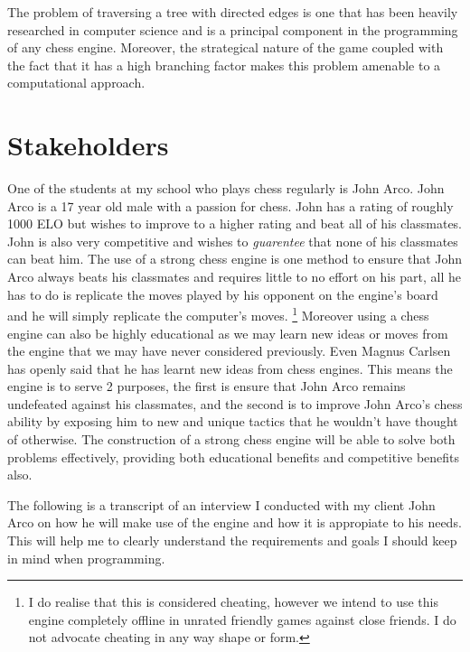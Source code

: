 The problem of traversing a tree with directed edges is one
that has been heavily researched in computer science and is 
a principal component in the programming of any chess engine.
Moreover, the strategical nature of the game coupled 
with the fact that it has a high branching factor makes this
problem amenable to a computational approach.


\section{Stakeholders}
One of the students at my school who plays chess regularly is 
John Arco. John Arco is a 17 year old male with a passion for chess.
John has a rating of roughly 1000 ELO but wishes 
to improve to a higher rating and beat all of his 
classmates. John is also very competitive and wishes to 
\textit{guarentee} that none of his classmates can beat him.
The use of a strong chess engine is one method to ensure
that John Arco always beats his classmates and requires little
to no effort on his part, all he has to do is replicate the 
moves played by his opponent on the engine's board and he 
will simply replicate the computer's moves. 
\footnote{I do realise that this is considered cheating,
however we intend to use this engine completely offline
in unrated friendly games against close friends. 
I do not advocate cheating in any way shape or form.}
Moreover using a chess engine can also be highly educational as
we may learn new ideas or moves from the engine that we may have
never considered previously. Even Magnus Carlsen
has openly said that he has learnt new ideas from chess engines.
\cite{lex} This means the engine is to serve 2 purposes,
the first is ensure that John Arco remains undefeated 
against his classmates, and the second is to improve John Arco's
chess ability by exposing him to new and unique tactics that 
he wouldn't have thought of otherwise. The construction of 
a strong chess engine will be able to solve both problems
effectively, providing both educational benefits and 
competitive benefits also. \par

The following is a transcript of an interview I
conducted with my client John Arco on how he will make use of the
engine and how it is appropiate to his needs. This will 
help me to clearly understand the requirements and goals I
should keep in mind when programming.\\

